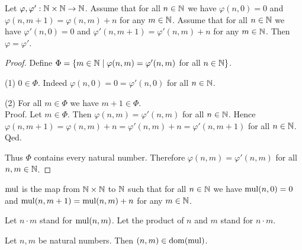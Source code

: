 \documentclass[../arithmetic.tex]{subfiles}
\begin{document}
  \begin{forthel}
    \begin{lemma}
      Let $\varphi, \varphi' : \mathbb{N} \times \mathbb{N} \to \mathbb{N}$.
      Assume that for all $n \in \mathbb{N}$ we have $\varphi(n, 0) = 0$ and
      $\varphi(n, m + 1) = \varphi(n,m) + n$ for any $m \in \mathbb{N}$.
      Assume that for all $n \in \mathbb{N}$ we have $\varphi'(n, 0) = 0$ and
      $\varphi'(n, m + 1) = \varphi'(n,m) + n$ for any $m \in \mathbb{N}$.
      Then $\varphi = \varphi'$.
    \end{lemma}
    \begin{proof}
      Define $\Phi = \{ m \in \mathbb{N} \mid \varphi(n,m) = \varphi'(n,m)$ for
      all $n \in \mathbb{N} \}$.

      (1) $0 \in \Phi$.
      Indeed $\varphi(n,0) = 0 = \varphi'(n,0)$ for all $n \in \mathbb{N}$.

      (2) For all $m \in \Phi$ we have $m + 1 \in \Phi$. \\
      Proof.
        Let $m \in \Phi$.
        Then $\varphi(n,m) = \varphi'(n,m)$ for all $n \in \mathbb{N}$.
        Hence $\varphi(n, m + 1)
          = \varphi(n,m) + n
          = \varphi'(n,m) + n
          = \varphi'(n, m + 1)$
        for all $n \in \mathbb{N}$.
      Qed.

      Thus $\Phi$ contains every natural number.
      Therefore $\varphi(n,m) = \varphi'(n,m)$ for all $n, m \in \mathbb{N}$.
    \end{proof}
  \end{forthel}

  \begin{forthel}
    \begin{definition}
      $\operatorname{mul}$ is the map from $\mathbb{N} \times \mathbb{N}$ to $\mathbb{N}$ such that for all
      $n \in \mathbb{N}$ we have $\operatorname{mul}(n, 0) = 0$ and $\operatorname{mul}(n, m + 1) =
      \operatorname{mul}(n, m) + n$ for any $m \in \mathbb{N}$.
    \end{definition}

    Let $n \cdot m$ stand for $\operatorname{mul}(n, m)$.
    Let the product of $n$ and $m$ stand for $n \cdot m$.
  \end{forthel}

  \begin{forthel}
    \begin{lemma}
      Let $n, m$ be natural numbers.
      Then $(n,m) \in \operatorname{dom}(\operatorname{mul})$.
    \end{lemma}
  \end{forthel}
\end{document}
